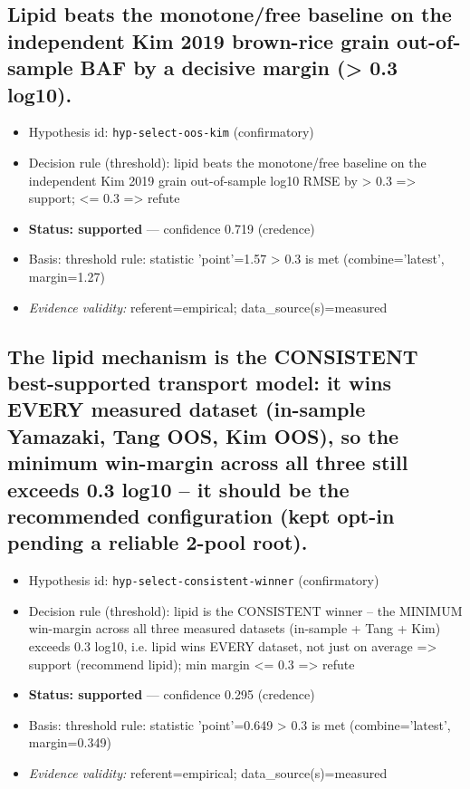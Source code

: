 \documentclass{article}
\begin{document}
\subsection{Lipid beats the monotone/free baseline on the independent Kim 2019 brown-rice grain out-of-sample BAF by a decisive margin (> 0.3 log10).}
\begin{itemize}
  \item Hypothesis id: \texttt{hyp-select-oos-kim} (confirmatory)
  \item Decision rule (threshold): lipid beats the monotone/free baseline on the independent Kim 2019 grain out-of-sample log10 RMSE by > 0.3 => support; <= 0.3 => refute
  \item \textbf{Status: supported} --- confidence 0.719 (credence)
  \item Basis: threshold rule: statistic 'point'=1.57 > 0.3 is met (combine='latest', margin=1.27)
  \item \textit{Evidence validity:} referent=empirical; data\_source(s)=measured
\end{itemize}

\subsection{The lipid mechanism is the CONSISTENT best-supported transport model: it wins EVERY measured dataset (in-sample Yamazaki, Tang OOS, Kim OOS), so the minimum win-margin across all three still exceeds 0.3 log10 -- it should be the recommended configuration (kept opt-in pending a reliable 2-pool root).}
\begin{itemize}
  \item Hypothesis id: \texttt{hyp-select-consistent-winner} (confirmatory)
  \item Decision rule (threshold): lipid is the CONSISTENT winner -- the MINIMUM win-margin across all three measured datasets (in-sample + Tang + Kim) exceeds 0.3 log10, i.e. lipid wins EVERY dataset, not just on average => support (recommend lipid); min margin <= 0.3 => refute
  \item \textbf{Status: supported} --- confidence 0.295 (credence)
  \item Basis: threshold rule: statistic 'point'=0.649 > 0.3 is met (combine='latest', margin=0.349)
  \item \textit{Evidence validity:} referent=empirical; data\_source(s)=measured
\end{itemize}
\end{document}
